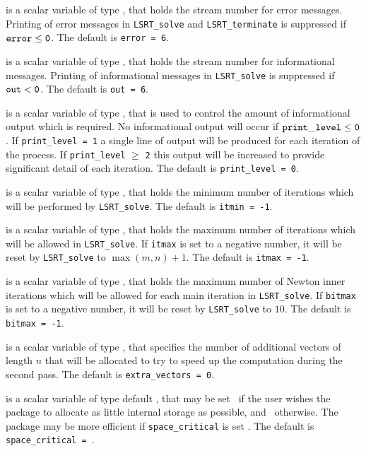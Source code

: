 \documentclass{galahad}
\newcommand{\packagename}{LS\-RT}
\begin{document}
\begin{description}
 is a scalar variable of type \integer, that holds the
stream number for error messages.
Printing of error messages in
{\tt \packagename\_solve} and {\tt \packagename\_terminate}
is suppressed if ${\tt error} \leq {\tt 0}$.
The default is {\tt error = 6}.

 is a scalar variable of type \integer, that holds the
stream number for informational messages.
Printing of informational messages in
{\tt \packagename\_solve} is suppressed if ${\tt out} < {\tt 0}$.
The default is {\tt out = 6}.

 is a scalar variable of type \integer,
that is used
to control the amount of informational output which is required. No
informational output will occur if ${\tt print\_level} \leq {\tt 0}$. If
{\tt print\_level = 1} a single line of output will be produced for each
iteration of the process. If {\tt print\_level} $\geq$ {\tt 2} this output
will be increased to provide significant detail of each iteration.
The default is {\tt print\_level = 0}.

 is a scalar variable of type \integer, that holds the
minimum number of iterations which will be performed by
{\tt \packagename\_solve}.
The default is {\tt itmin = -1}.

 is a scalar variable of type \integer, that holds the
maximum number of iterations which will be allowed in
{\tt \packagename\_solve}.
If {\tt itmax} is set to a negative number, it will be reset by
{\tt \packagename\_solve} to $\max(m,n)+1$.
The default is {\tt itmax = -1}.

 is a scalar variable of type \integer, that holds the
maximum number of Newton inner iterations which will be allowed for each
main iteration in {\tt \packagename\_solve}.
If {\tt bitmax} is set to a negative number, it will be reset by
{\tt \packagename\_solve} to $10$.
The default is {\tt bitmax = -1}.

 is a scalar variable of type \integer,
that specifies the number of additional vectors of length $n$
that will be allocated to try to speed up the computation during the
second pass.
The default is {\tt extra\_vectors = 0}.

 is a scalar variable of type default \logical, that
may be set \true\ if the user wishes the package to allocate as little
internal storage as possible, and \false\ otherwise. The package may
be more efficient if {\tt space\_critical} is set \false.
The default is {\tt space\_critical = \false}.


\end{description}
\end{document}
